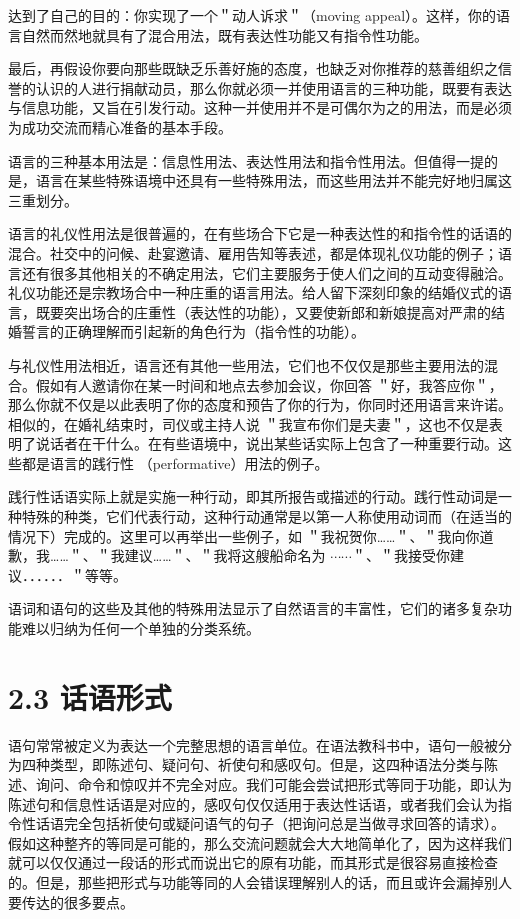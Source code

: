 达到了自己的目的：你实现了一个＂动人诉求＂（moving appeal）。这样，你的语言自然而然地就具有了混合用法，既有表达性功能又有指令性功能。

最后，再假设你要向那些既缺乏乐善好施的态度，也缺乏对你推荐的慈善组织之信誉的认识的人进行捐献动员，那么你就必须一并使用语言的三种功能，既要有表达与信息功能，又旨在引发行动。这种一并使用并不是可偶尔为之的用法，而是必须为成功交流而精心准备的基本手段。

语言的三种基本用法是：信息性用法、表达性用法和指令性用法。但值得一提的是，语言在某些特殊语境中还具有一些特殊用法，而这些用法并不能完好地归属这三重划分。

语言的礼仪性用法是很普遍的，在有些场合下它是一种表达性的和指令性的话语的混合。社交中的问候、赴宴邀请、雇用告知等表述，都是体现礼仪功能的例子；语言还有很多其他相关的不确定用法，它们主要服务于使人们之间的互动变得融洽。礼仪功能还是宗教场合中一种庄重的语言用法。给人留下深刻印象的结婚仪式的语言，既要突出场合的庄重性（表达性的功能），又要使新郎和新娘提高对严肃的结婚誓言的正确理解而引起新的角色行为（指令性的功能）。

与礼仪性用法相近，语言还有其他一些用法，它们也不仅仅是那些主要用法的混合。假如有人邀请你在某一时间和地点去参加会议，你回答 ＂好，我答应你＂，那么你就不仅是以此表明了你的态度和预告了你的行为，你同时还用语言来许诺。相似的，在婚礼结束时，司仪或主持人说 ＂我宣布你们是夫妻＂，这也不仅是表明了说话者在干什么。在有些语境中，说出某些话实际上包含了一种重要行动。这些都是语言的践行性 （performative）用法的例子。

践行性话语实际上就是实施一种行动，即其所报告或描述的行动。践行性动词是一种特殊的种类，它们代表行动，这种行动通常是以第一人称使用动词而（在适当的情况下）完成的。这里可以再举出一些例子，如 ＂我祝贺你……＂、＂我向你道歉，我……＂、＂我建议……＂、＂我将这艘船命名为 $\cdots \cdots$＂、＂我接受你建议．．．．．．＂等等。

语词和语句的这些及其他的特殊用法显示了自然语言的丰富性，它们的诸多复杂功能难以归纳为任何一个单独的分类系统。

\section*{2.3 话语形式}
语句常常被定义为表达一个完整思想的语言单位。在语法教科书中，语句一般被分为四种类型，即陈述句、疑问句、祈使句和感叹句。但是，这四种语法分类与陈述、询问、命令和惊叹并不完全对应。我们可能会尝试把形式等同于功能，即认为陈述句和信息性话语是对应的，感叹句仅仅适用于表达性话语，或者我们会认为指令性话语完全包括祈使句或疑问语气的句子（把询问总是当做寻求回答的请求）。假如这种整齐的等同是可能的，那么交流问题就会大大地简单化了，因为这样我们就可以仅仅通过一段话的形式而说出它的原有功能，而其形式是很容易直接检查的。但是，那些把形式与功能等同的人会错误理解别人的话，而且或许会漏掉别人要传达的很多要点。

